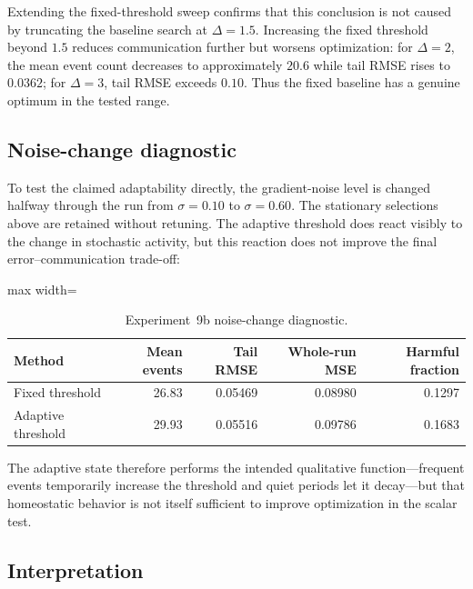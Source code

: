 Extending the fixed-threshold sweep confirms that this conclusion is not caused by truncating the baseline search at $\Delta=1.5$. Increasing the fixed threshold beyond $1.5$ reduces communication further but worsens optimization: for $\Delta=2$, the mean event count decreases to approximately $20.6$ while tail RMSE rises to $0.0362$; for $\Delta=3$, tail RMSE exceeds $0.10$. Thus the fixed baseline has a genuine optimum in the tested range.

\subsection{Noise-change diagnostic}

To test the claimed adaptability directly, the gradient-noise level is changed halfway through the run from $\sigma=0.10$ to $\sigma=0.60$. The stationary selections above are retained without retuning. The adaptive threshold does react visibly to the change in stochastic activity, but this reaction does not improve the final error--communication trade-off:
\begin{table}[ht]
\centering
\caption{Experiment~9b noise-change diagnostic.}
\label{tab:exp9b-shift}
\begin{adjustbox}{max width=\textwidth}
\begin{tabular}{lrrrr}
\toprule
Method & Mean events & Tail RMSE & Whole-run MSE & Harmful fraction\\
\midrule
Fixed threshold & 26.83 & 0.05469 & 0.08980 & 0.1297\\
Adaptive threshold & 29.93 & 0.05516 & 0.09786 & 0.1683\\
\bottomrule
\end{tabular}
\end{adjustbox}
\end{table}
The adaptive state therefore performs the intended qualitative function---frequent events temporarily increase the threshold and quiet periods let it decay---but that homeostatic behavior is not itself sufficient to improve optimization in the scalar test.

\subsection{Interpretation}

